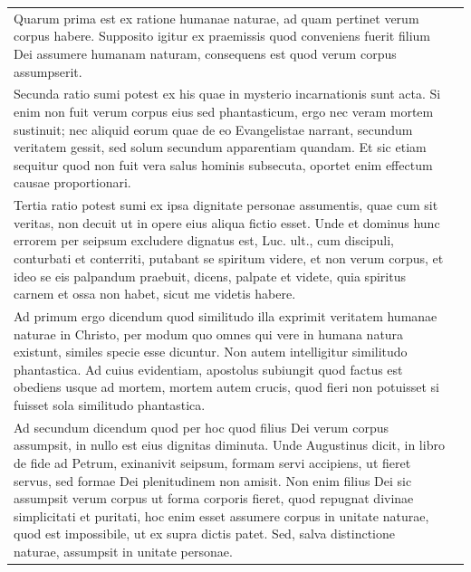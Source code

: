 \documentclass[paper=a4paper,fontsize=10pt,jafontsize=9pt,titlepage]{jlreq}
\begin{document}
\begin{longtable}{p{21em}p{21em}}
Quarum prima est ex ratione humanae naturae, ad quam pertinet
verum corpus habere. Supposito igitur ex praemissis quod conveniens
fuerit filium Dei assumere humanam naturam, consequens est quod verum
corpus assumpserit. 



&



\\

Secunda ratio sumi potest ex his quae in mysterio
incarnationis sunt acta. Si enim non fuit verum corpus eius sed
phantasticum, ergo nec veram mortem sustinuit; nec aliquid eorum quae de
eo Evangelistae narrant, secundum veritatem gessit, sed solum secundum
apparentiam quandam. Et sic etiam sequitur quod non fuit vera salus
hominis subsecuta, oportet enim effectum causae proportionari. 



&



\\

Tertia
ratio potest sumi ex ipsa dignitate personae assumentis, quae cum sit
veritas, non decuit ut in opere eius aliqua fictio esset. Unde et
dominus hunc errorem per seipsum excludere dignatus est, Luc. ult., cum
discipuli, conturbati et conterriti, putabant se spiritum videre, et non
verum corpus, et ideo se eis palpandum praebuit, dicens, palpate et
videte, quia spiritus carnem et ossa non habet, sicut me videtis habere.


&


\\



Ad primum ergo dicendum quod similitudo illa exprimit veritatem humanae
naturae in Christo, per modum quo omnes qui vere in humana natura
existunt, similes specie esse dicuntur. Non autem intelligitur
similitudo phantastica. Ad cuius evidentiam, apostolus subiungit quod
factus est obediens usque ad mortem, mortem autem crucis, quod fieri non
potuisset si fuisset sola similitudo phantastica.


&


\\




Ad secundum dicendum quod per hoc quod filius Dei verum corpus
assumpsit, in nullo est eius dignitas diminuta. Unde Augustinus dicit,
in libro de fide ad Petrum, exinanivit seipsum, formam servi accipiens,
ut fieret servus, sed formae Dei plenitudinem non amisit. Non enim
filius Dei sic assumpsit verum corpus ut forma corporis fieret, quod
repugnat divinae simplicitati et puritati, hoc enim esset assumere
corpus in unitate naturae, quod est impossibile, ut ex supra dictis
patet. Sed, salva distinctione naturae, assumpsit in unitate personae.



\end{longtable}
\end{document}

